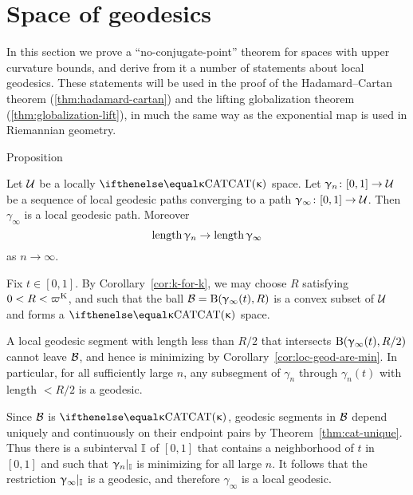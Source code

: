 
\section{Space of geodesics}\label{sec:geod-space}

In this section we prove a  ``no-conjugate-point'' theorem for spaces with upper curvature bounds, and derive from it a number of statements about
local geodesics.  These statements will be used in the proof of the Hadamard--Cartan theorem (\ref{thm:hadamard-cartan}) and the lifting
 globalization theorem (\ref{thm:globalization-lift}), in much the same way as  the exponential map is used in Riemannian geometry.

\begin{thm}{Proposition}\label{prop:geo-complete}
{\sloppy 
Let $\mathcal{U}$ be a locally $\CAT\kappa$ space.
 Let $\gamma_n\:[0,1]\to\spc{U}$ be a sequence of local geodesic paths converging to a path $\gamma_\infty\:[0,1]\to\spc{U}$.
Then $\gamma_\infty$ is a local geodesic path.
Moreover 
\[\length\gamma_n\to\length\gamma_\infty\]
as $n\to\infty$.

}
\end{thm}

Fix $t\in[0,1]$.
By Corollary~\ref{cor:k-for-k}, we may choose $R$ satisfying $0<R<\varpi\Kappa$,
and such that
the ball $\mathcal{B}=\mathrm{B}{}(\upgamma_\infty(t),R)$ is a convex subset of $\mathcal{U}$ and forms a $\CAT\kappa$ space.



A local geodesic segment  with length less than $R/2$ that intersects $\mathrm{B}{}(\upgamma_\infty(t),R/2)$ cannot leave $\mathcal{B}$, and hence  is  minimizing by Corollary~\ref{cor:loc-geod-are-min}.  In particular, for all sufficiently large $n$, any subsegment  of $\gamma_n$ through $\gamma_n(t)$  with length $<R/2$ is a geodesic.


Since $\mathcal{B}$ is $\CAT\kappa$, geodesic segments in $\mathcal{B}$ depend uniquely and continuously on their endpoint pairs by Theorem~\ref{thm:cat-unique}.  
Thus there is a subinterval $\mathbb{I}$ of $[0,1]$
that contains a neighborhood of $t$ in $[0,1]$
and such that $\upgamma_n|_{\mathbb{I}}$ is minimizing for all large $n$.
It follows that the restriction $\upgamma_\infty|_{\mathbb{I}}$ is a geodesic,
and therefore $\gamma_\infty$ is a local geodesic.
\qeds


